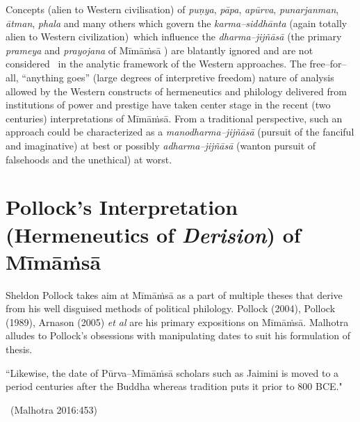 Concepts (alien to Western civilisation) of \textit{puṇya}, \textit{pāpa}, \textit{apūrva}, \textit{punarjanman}, \textit{ātman}, \textit{phala} and many others which govern the \textit{karma–siddhānta} (again totally alien to Western civilization) which influence the \textit{dharma–jijñāsā} (the primary \textit{prameya} and \textit{prayojana} of Mīmāṁsā ) are blatantly ignored and are not considered  in the analytic framework of the Western approaches. The free–for–all, “anything goes” (large degrees of interpretive freedom) nature of analysis allowed by the Western constructs of hermeneutics and philology delivered from institutions of power and prestige have taken center stage in the recent (two centuries) interpretations of Mīmāṁsā. From a traditional perspective, such an approach could be characterized as a \textit{manodharma–jijñāsā} (pursuit of the fanciful and imaginative) at best or possibly \textit{adharma–jijñāsā} (wanton pursuit of falsehoods and the unethical) at worst.


\section*{Pollock’s Interpretation (Hermeneutics of \textit{Derision}) of Mīmāṁsā}

Sheldon Pollock takes aim at Mīmāṁsā as a part of multiple theses that derive from his well disguised methods of political philology. Pollock (2004), Pollock (1989), Arnason (2005) \textit{et al} are his primary expositions on Mīmāṁsā. Malhotra alludes to Pollock’s obsessions with manipulating dates to suit his formulation of thesis.

\begin{myquote}
“Likewise, the date of Pūrva–Mīmāṁsā scholars such as Jaimini is moved to a period centuries after the Buddha whereas tradition puts it prior to 800 BCE."

~\hfill (Malhotra 2016:453)
\end{myquote}

